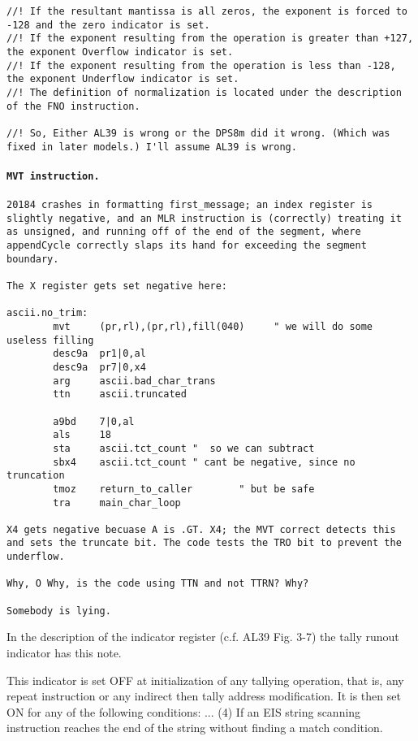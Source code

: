 \documentclass[notitlepage]{report}
\begin{document}
\begin{verbatim}
//! If the resultant mantissa is all zeros, the exponent is forced to -128 and the zero indicator is set.
//! If the exponent resulting from the operation is greater than +127, the exponent Overflow indicator is set.
//! If the exponent resulting from the operation is less than -128, the exponent Underflow indicator is set.
//! The definition of normalization is located under the description of the FNO instruction.

//! So, Either AL39 is wrong or the DPS8m did it wrong. (Which was fixed in later models.) I'll assume AL39 is wrong.

\end{verbatim}



\paragraph{\texttt{MVT instruction.}}

\begin{verbatim}
20184 crashes in formatting first_message; an index register is
slightly negative, and an MLR instruction is (correctly) treating it
as unsigned, and running off of the end of the segment, where
appendCycle correctly slaps its hand for exceeding the segment
boundary.

The X register gets set negative here:

ascii.no_trim:
        mvt     (pr,rl),(pr,rl),fill(040)     " we will do some useless filling
        desc9a  pr1|0,al
        desc9a  pr7|0,x4
        arg     ascii.bad_char_trans
        ttn     ascii.truncated

        a9bd    7|0,al
        als     18
        sta     ascii.tct_count "  so we can subtract
        sbx4    ascii.tct_count " cant be negative, since no truncation
        tmoz    return_to_caller        " but be safe
        tra     main_char_loop

X4 gets negative becuase A is .GT. X4; the MVT correct detects this
and sets the truncate bit. The code tests the TRO bit to prevent the
underflow.

Why, O Why, is the code using TTN and not TTRN? Why?

Somebody is lying.
\end{verbatim}

In the description of the indicator register (c.f. AL39 Fig. 3-7) the tally runout indicator has this note. 

This indicator is set OFF at initialization of any tallying operation, that is, any repeat instruction or any indirect then 
tally address modification. It is then set ON for any of the following conditions: ...
(4) If an EIS string scanning instruction reaches the end of the string without finding a match condition.
\end{document}
